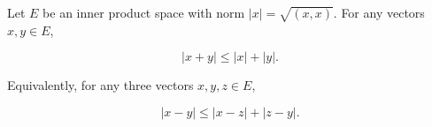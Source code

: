 Let $E$ be an inner product space with norm $|x| = \sqrt{(x, x)}$. For any vectors $x, y \in E$,

$$|x + y| \leq |x| + |y|.$$

Equivalently, for any three vectors $x, y, z \in E$,

$$|x - y| \leq |x - z| + |z - y|.$$
